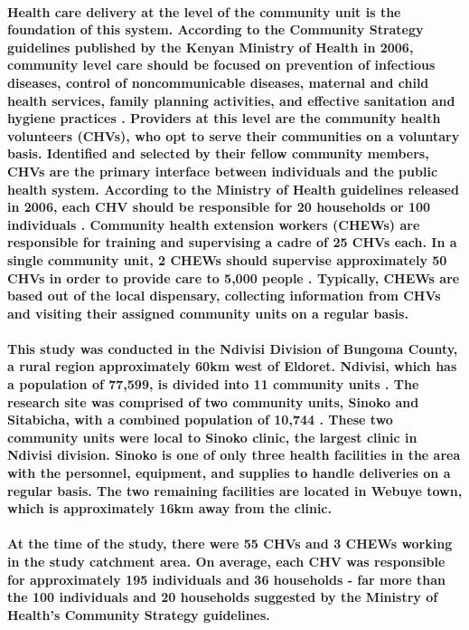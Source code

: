 \paragraph{Health care delivery at the level of the community unit is the foundation of this system. According to the Community Strategy guidelines published by the Kenyan Ministry of Health in 2006, community level care should be focused on prevention of infectious diseases, control of noncommunicable diseases, maternal and child health services, family planning activities, and effective sanitation and hygiene practices \citep{CommunityStrategy2006}. Providers at this level are the community  health volunteers (CHVs), who opt to serve their communities on a voluntary basis. Identified and selected by their fellow community members, CHVs are the primary interface between individuals and the public health system. According to the Ministry of Health guidelines released in 2006, each CHV should be responsible for 20 households or 100 individuals \citep{CommunityStrategy2006}. Community health extension workers (CHEWs) are responsible for training and supervising a cadre of 25 CHVs each. In a single community unit, 2 CHEWs should supervise approximately 50 CHVs in order to provide care to 5,000 people \citep{CommunityStrategy2006}. Typically, CHEWs are based out of the local dispensary, collecting information from CHVs and visiting their assigned community units on a regular basis.}

\paragraph{This study was conducted in the Ndivisi Division of Bungoma County, a rural region approximately 60km west of Eldoret. 
Ndivisi, which has a population of 77,599, is divided into 11 community units \citep{Census2009}. The research site was comprised of two community units, Sinoko and Sitabicha, with a combined population of 10,744 \citep{Census2009}. These two community units were local to Sinoko clinic, the largest clinic in Ndivisi division. Sinoko is one of only three health facilities in the area with the personnel, equipment, and supplies to handle deliveries on a regular basis. The two remaining facilities are located in Webuye town, which is approximately 16km away from the clinic.}

\paragraph{At the time of the study, there were 55 CHVs and 3 CHEWs working in the study catchment area. On average, each CHV was responsible for approximately 195 individuals and 36 households - far more than the 100 individuals and 20 households suggested by the Ministry of Health's Community Strategy guidelines.} 


